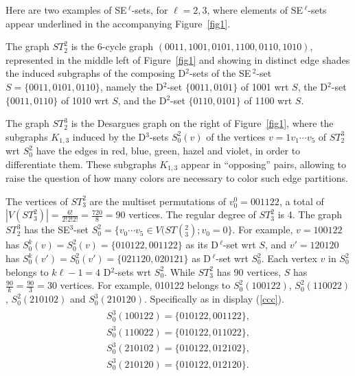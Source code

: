 \documentclass[12pt,reqno]{article}
\begin{document}
\begin{example} Here are two examples of SE$\,^\ell$-sets, for $\ell=2,3$, where elements of SE$\,^\ell$-sets appear underlined in the accompanying Figure~\ref{fig1}.

The graph $ST_2^2$ is the 6-cycle graph $(0011,1001,0101,1100,0110,1010)$, represented in the middle left of Figure~\ref{fig1} and showing in distinct edge shades the induced subgraphs of the composing D$^2$-sets of the SE$\,^2$-set $S=\{0011,0101,0110\}$, namely the D$^2$-set $\{0011,0101\}$ of 1001 wrt $S$, the D$^2$-set $\{0011,0110\}$ of 1010 wrt $S$, and the D$^2$-set $\{0110,0101\}$ of 1100 wrt $S$. 

 The graph $ST_2^3$ is the Desargues graph on the right of Figure~\ref{fig1}, where the subgraphs $K_{1,3}$ induced by the D$^3$-sets $S_0^2(v)$ of the vertices $v=1v_1\cdots v_5$ of $ST_2^3$ wrt $S_0^2$ have the edges in red, blue, green, hazel and violet, in order to differentiate them. These subgraphs $K_{1,3}$ appear in ``opposing'' pairs, allowing to raise the question of how many colors are necessary to color such edge partitions.
\end{example}

\begin{example}
The vertices of $ST_3^2$ are the multiset permutations of $v_0^0=001122$, a total of $|V(ST_3^2)|=\frac{6!}{2!2!2!}=\frac{720}{8}=90$ vertices. The regular degree of $ST_3^2$ is 4.
The graph $ST^3_2$ has the SE$^3$-set $S_0^2=\{v_0\cdots v_5\in V(ST(_3^2);v_0=0\}$. 
For example, $v=100122$ has $S^k_0(v)=S^2_0(v)=\{010122,001122\}$ as its D$\,^\ell$-set wrt $S$, 
and $v'=120120$ has $S^k_0(v')=S^2_0(v')=\{021120,020121\}$ as D$\,^\ell$-set wrt $S_0^2$. Each vertex $v$ in $S_0^2$ belongs to $k\ell-1=4$ D$^2$-sets wrt $S_0^2$. 
While $ST_3^2$ has 90 vertices, $S$ has $\frac{90}{k}=\frac{90}{3}=30$ vertices.
For example, 010122 belongs to $S^2_0(100122)$, $S^2_0(110022)$, $S^2_0(210102)$ and $S^3_0(210120)$. Specifically as in display (\ref{ccc}).
\begin{eqnarray}\label{ccc}\begin{array}{ccc}
S_0^3(100122)=\{010122,001122\},\\
S_0^3(110022)=\{010122,011022\},\\
S_0^3(210102)=\{010122,012102\},\\
S_0^3(210120)=\{010122,012120\}.\end{array}\end{eqnarray}
\end{example}
\end{document}
